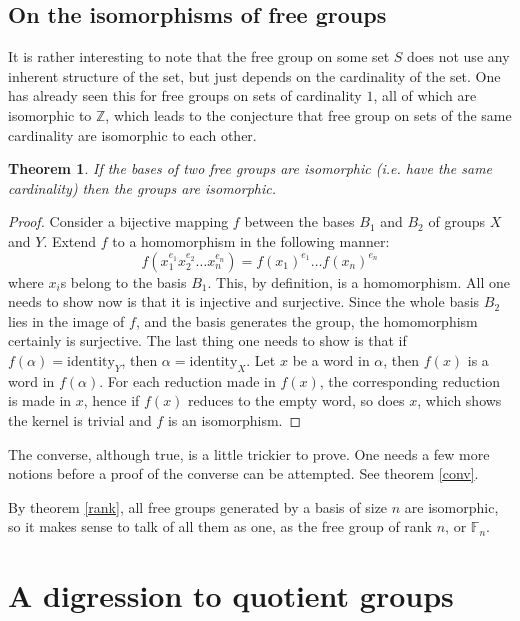 \documentclass[12pt, titlepage]{article}
\newtheorem{thm}{Theorem}[section]
\theoremstyle{definition}
\begin{document}
\subsection{On the isomorphisms of free groups\cite{lyndon}}

It is rather interesting to note that the free group on some set $S$ does not use any inherent structure of the set, but just depends on the cardinality of the set. One has already seen this for free groups on sets of cardinality $1$, all of which are isomorphic to $\mathbb{Z}$, which leads to the conjecture that free group on sets of the same cardinality are isomorphic to each other.

\begin{thm}\label{rank}
If the bases of two free groups are isomorphic (i.e. have the same cardinality) then the groups are isomorphic.
\end{thm}

\begin{proof}
Consider a bijective mapping $f$ between the bases $B_1$ and $B_2$ of groups $X$ and $Y$. Extend $f$ to a homomorphism in the following manner:
$$f(x_1^{e_1}x_2^{e_2} \ldots x_n^{e_n}) = f(x_1)^{e_1}\ldots f(x_n)^{e_n}$$
where $x_i$s belong to the basis $B_1$. This, by definition, is a homomorphism. All one needs to show now is that it is injective and surjective. Since the whole basis $B_2$ lies in the image of $f$,  and the basis generates the group, the homomorphism certainly is surjective. The last thing one needs to show is that if $f(\alpha)=\mathrm{identity}_{Y}$, then $\alpha=\mathrm{identity}_{X}$. Let $x$ be a word in $\alpha$, then $f(x)$ is a word in $f(\alpha)$. For each reduction made in $f(x)$, the corresponding reduction is made in $x$, hence if $f(x)$ reduces to the empty word, so does $x$, which shows the kernel is trivial and $f$ is an isomorphism.
\end{proof}


The converse, although true, is a little trickier to prove. One needs a few more notions before a proof of the converse can be attempted. See theorem \autoref{conv}.

By theorem \autoref{rank}, all free groups generated by a basis of size $n$ are isomorphic, so it makes sense to talk of all them as one, as the free group of rank $n$, or $\mathbb{F}_n$.


\section{A digression to quotient groups}
\end{document}
